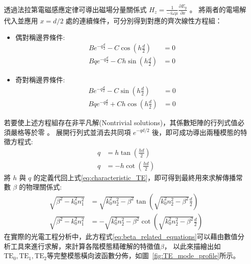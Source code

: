 透過法拉第電磁感應定律可導出磁場分量關係式 $H_{z} = \frac{1}{-i\omega\mu}\frac{\partial E_{y}}{\partial x}$ 。
將兩者的電場解代入並應用 $x = d/2$ 處的連續條件，可分別得到對應的齊次線性方程組：
\begin{itemize}
    \item 偶對稱邊界條件:
    \begin{align}
    B e^{-q\frac{d}{2}} - C \cos\left(h\frac{d}{2}\right) &= 0 \\
    B q e^{-q\frac{d}{2}} - C h \sin\left(h\frac{d}{2}\right) &= 0
    \end{align}
    \item 奇對稱邊界條件:
    \begin{align}
    B e^{-q\frac{d}{2}} - C \sin\left(h\frac{d}{2}\right) &= 0 \\
    B q e^{-q\frac{d}{2}} + C h \cos\left(h\frac{d}{2}\right) &= 0
    \end{align}
\end{itemize}
若要使上述方程組存在非平凡解(Nontrivial solutions)，其係數矩陣的行列式值必須嚴格等於零 。
展開行列式並消去共同項 $e^{-qd/2}$ 後，即可成功導出兩種模態的特徵方程式:
\begin{subequations}
\label{eq:characteristic_TE}
\begin{align}
q &= h \tan\left(\frac{hd}{2}\right)
\label{eq:characteristic_TE_even} \\
q &= -h \cot\left(\frac{hd}{2}\right)
\label{eq:characteristic_TE_odd}
\end{align}
\end{subequations}
將 $h$ 與 $q$ 的定義代回上式\eqref{eq:characteristic_TE}，即可得到最終用來求解傳播常數 $\beta$ 的物理關係式:
\begin{subequations}
\label{eq:beta_related_equations}
\begin{align}
\sqrt{\beta^{2}-k_{0}^{2}n_{1}^{2}}
&=
\sqrt{k_{0}^{2}n_{2}^{2}-\beta^{2}}
\tan\left(
\sqrt{k_{0}^{2}n_{2}^{2}-\beta^{2}}
\frac{d}{2}
\right)
\label{eq:beta_even}
\\
\sqrt{\beta^{2}-k_{0}^{2}n_{1}^{2}}
&=
-\sqrt{k_{0}^{2}n_{2}^{2}-\beta^{2}}
\cot\left(
\sqrt{k_{0}^{2}n_{2}^{2}-\beta^{2}}
\frac{d}{2}
\right)
\label{eq:beta_odd}
\end{align}
\end{subequations}
在實際的光電工程分析中，此方程式\eqref{eq:beta_related_equations}可以藉由數值分析工具來進行求解，來計算各階模態精確解的特徵值$\beta$，
以此來描繪出如$\text{TE}_0, \text{TE}_1, \text{TE}_2$等完整模態橫向波函數分佈，如圖~\ref{fig:TE_mode_profile}所示。
